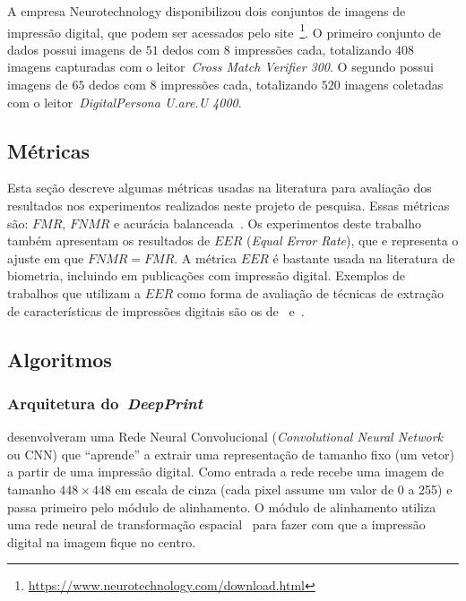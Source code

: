 A empresa Neurotechnology disponibilizou dois conjuntos de imagens de impressão digital, que podem ser acessados pelo site~\footnote{\url{https://www.neurotechnology.com/download.html}}. O primeiro conjunto de dados possui imagens de $51$ dedos com $8$ impressões cada, totalizando $408$ imagens capturadas com o leitor~\textit{Cross Match Verifier 300}. O segundo possui imagens de $65$ dedos com 8 impressões cada, totalizando $520$ imagens coletadas com o leitor~\textit{DigitalPersona U.are.U 4000}.


\subsection{Métricas}\label{subsec:metricas}

Esta seção descreve algumas métricas usadas na literatura para avaliação dos resultados nos experimentos realizados neste projeto de pesquisa. Essas métricas são: $FMR$, $FNMR$ e acurácia balanceada~\cite{Precise2014, Ferlini2021eargate}. Os experimentos deste trabalho também apresentam os resultados de $EER$ (\textit{Equal Error Rate}), que e representa o ajuste em que $FNMR = FMR$. A métrica $EER$ é bastante usada na literatura de biometria, incluindo em publicações com impressão digital. Exemplos de trabalhos que utilizam a $EER$ como forma de avaliação de técnicas de extração de características de impressões digitais são os de~ e~.

\subsection{Algoritmos}\label{subsec:algoritmos}


\subsubsection{Arquitetura do~\textit{DeepPrint}}\label{subsubsec:deepprint-arch}

 desenvolveram uma Rede Neural Convolucional (\textit{Convolutional Neural Network} ou CNN) que ``aprende'' a extrair uma representação de tamanho fixo (um vetor) a partir de uma impressão digital. Como entrada a rede recebe uma imagem de tamanho $448 \times 448$ em escala de cinza (cada pixel assume um valor de 0 a 255) e passa primeiro pelo módulo de alinhamento. O módulo de alinhamento utiliza uma rede neural de transformação espacial~\cite{spatial-transformer-networks} para fazer com que a impressão digital na imagem fique no centro. 

